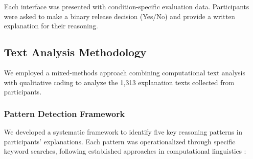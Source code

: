 Each interface was presented with condition-specific evaluation data. Participants were asked to make a binary release decision (Yes/No) and provide a written explanation for their reasoning.

\subsection{Text Analysis Methodology}
We employed a mixed-methods approach combining computational text analysis with qualitative coding to analyze the 1,313 explanation texts collected from participants.

\subsubsection{Pattern Detection Framework}
We developed a systematic framework to identify five key reasoning patterns in participants' explanations. Each pattern was operationalized through specific keyword searches, following established approaches in computational linguistics \cite{Hutto2014}:

